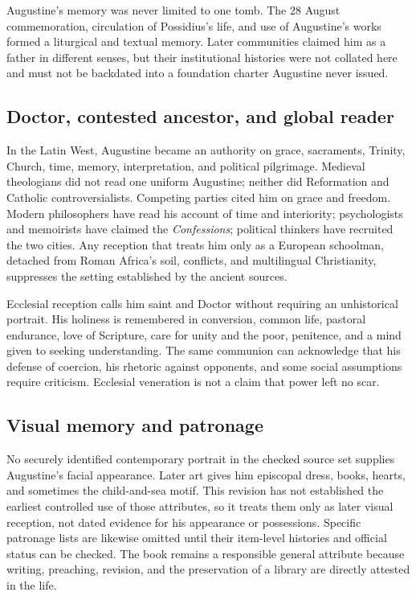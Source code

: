 Augustine's memory was never limited to one tomb. The 28 August
commemoration, circulation of Possidius's life, and use of Augustine's works
formed a liturgical and textual memory. Later communities claimed him as a
father in different senses, but their institutional histories were not
collated here and must not be backdated into a foundation charter Augustine
never issued.

\subsection{Doctor, contested ancestor, and global reader}

In the Latin West, Augustine became an authority on grace, sacraments,
Trinity, Church, time, memory, interpretation, and political pilgrimage.
Medieval theologians did not read one uniform Augustine; neither did
Reformation and Catholic controversialists. Competing parties cited him on
grace and freedom. Modern philosophers have read his account of time and
interiority; psychologists and memoirists have claimed the
\emph{Confessions}; political thinkers have recruited the two cities. Any
reception that treats him only as a European schoolman, detached from Roman
Africa's soil, conflicts, and multilingual Christianity, suppresses the
setting established by the ancient sources.

Ecclesial reception calls him saint and Doctor without requiring an
unhistorical portrait. His holiness is remembered in conversion, common life,
pastoral endurance, love of Scripture, care for unity and the poor, penitence,
and a mind given to seeking understanding. The same communion can acknowledge
that his defense of coercion, his rhetoric against opponents, and some social
assumptions require criticism. Ecclesial veneration is not a claim that power
left no scar.

\subsection{Visual memory and patronage}

No securely identified contemporary portrait in the checked source set
supplies Augustine's facial appearance. Later art gives him episcopal dress,
books, hearts, and sometimes the child-and-sea motif. This revision has not
established the earliest controlled use of those attributes, so it treats them
only as later visual reception, not dated evidence for his appearance or
possessions. Specific patronage lists are likewise omitted until their
item-level histories and official status can be checked. The book remains a
responsible general attribute because writing, preaching, revision, and the
preservation of a library are directly attested in the life.
